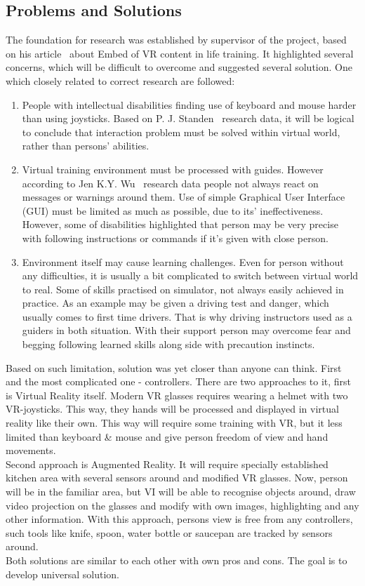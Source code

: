 \documentclass[18pt]{article}
\numberwithin{equation}{section} %
\numberwithin{figure}{section} %
\numberwithin{table}{section} %
\begin{document}
	\subsection{Problems and Solutions}
	The foundation for research was established by supervisor of the project, based on his article~\cite{quteprints100187} about Embed of VR content in life training. It highlighted several concerns, which will be difficult to overcome and suggested several solution. One which closely related to correct research are followed: \\	
	\begin{enumerate}
		\item People with intellectual disabilities finding use of keyboard and mouse harder than using joysticks. Based on P. J. Standen~\cite{control} research data, it will be logical to conclude that interaction problem must be solved within virtual world, rather than persons' abilities.
		\item Virtual training environment must be processed with guides. However according to Jen K.Y. Wu~\cite{WU20058} research data people not always react on messages or warnings around them. Use of simple Graphical User Interface (GUI) must be limited as much as possible, due to its' ineffectiveness. However, some of disabilities highlighted that person may be very precise with following instructions or commands if it's given with close person.
		\item Environment itself may cause learning challenges. Even for person without any difficulties, it is usually a bit complicated to switch between virtual world to real. Some of skills practised on simulator, not always easily achieved in practice. As an example may be given a driving test and danger, which usually comes to first time drivers. That is why driving instructors used as a guiders in both situation. With their support person may overcome fear and begging following learned skills along side with precaution instincts.
	\end{enumerate}
	Based on such limitation, solution was yet closer than anyone can think. First and the most complicated one - controllers. There are two approaches to it, first is Virtual Reality itself. Modern VR glasses requires wearing a helmet with two VR-joysticks. This way, they hands will be processed and displayed in virtual reality like their own. This way will require some training with VR, but it less limited than keyboard \& mouse and give person freedom of view and hand movements. \\
	Second approach is Augmented Reality. It will require specially established kitchen area with several sensors around and modified VR glasses. Now, person will be in the familiar area, but VI will be able to recognise objects around, draw video projection on the glasses and modify with own images, highlighting and any other information. With this approach, persons view is free from any controllers, such tools like knife, spoon, water bottle or saucepan are tracked by sensors around.\\
	Both solutions are similar to each other with own pros and cons. The goal is to develop universal solution. \\
	
\end{document}
